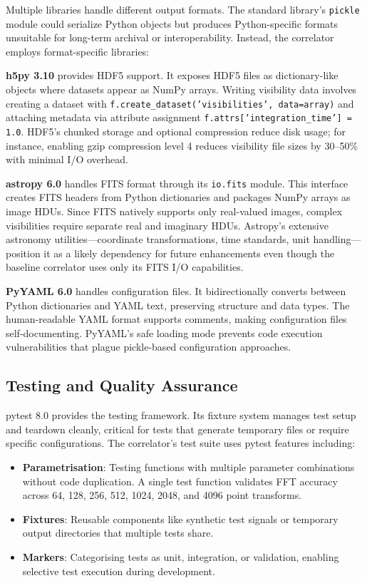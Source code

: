 Multiple libraries handle different output formats. The standard library's \texttt{pickle} module could serialize Python objects but produces Python-specific formats unsuitable for long-term archival or interoperability. Instead, the correlator employs format-specific libraries:

\textbf{h5py 3.10} provides HDF5 support. It exposes HDF5 files as dictionary-like objects where datasets appear as NumPy arrays. Writing visibility data involves creating a dataset with \texttt{f.create\_dataset('visibilities', data=array)} and attaching metadata via attribute assignment \texttt{f.attrs['integration\_time'] = 1.0}. HDF5's chunked storage and optional compression reduce disk usage; for instance, enabling gzip compression level 4 reduces visibility file sizes by 30–50\% with minimal I/O overhead.

\textbf{astropy 6.0} handles FITS format through its \texttt{io.fits} module. This interface creates FITS headers from Python dictionaries and packages NumPy arrays as image HDUs. Since FITS natively supports only real-valued images, complex visibilities require separate real and imaginary HDUs. Astropy's extensive astronomy utilities—coordinate transformations, time standards, unit handling—position it as a likely dependency for future enhancements even though the baseline correlator uses only its FITS I/O capabilities.

\textbf{PyYAML 6.0} handles configuration files. It bidirectionally converts between Python dictionaries and YAML text, preserving structure and data types. The human-readable YAML format supports comments, making configuration files self-documenting. PyYAML's safe loading mode prevents code execution vulnerabilities that plague pickle-based configuration approaches.

\subsection{Testing and Quality Assurance}

pytest 8.0 provides the testing framework. Its fixture system manages test setup and teardown cleanly, critical for tests that generate temporary files or require specific configurations. The correlator's test suite uses pytest features including:

\begin{itemize}
    \item \textbf{Parametrisation}: Testing functions with multiple parameter combinations without code duplication. A single test function validates FFT accuracy across 64, 128, 256, 512, 1024, 2048, and 4096 point transforms.
    
    \item \textbf{Fixtures}: Reusable components like synthetic test signals or temporary output directories that multiple tests share.
    
    \item \textbf{Markers}: Categorising tests as unit, integration, or validation, enabling selective test execution during development.
\end{itemize}


